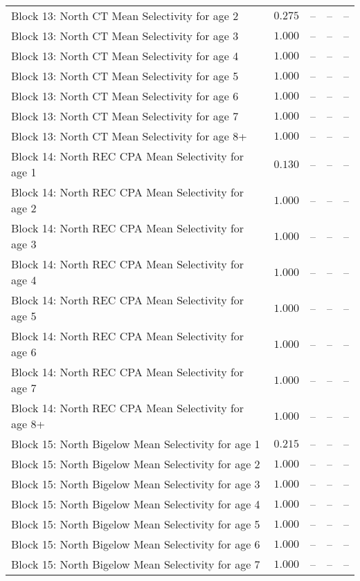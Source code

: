\documentclass[
]{article}
\begin{document}
\begin{landscape}
\begin{longtable}[t]{lrrrr}
Block 13: North CT Mean Selectivity for age 2 & $0.275$ & -- & -- & --\\
\addlinespace
Block 13: North CT Mean Selectivity for age 3 & $1.000$ & -- & -- & --\\
Block 13: North CT Mean Selectivity for age 4 & $1.000$ & -- & -- & --\\
Block 13: North CT Mean Selectivity for age 5 & $1.000$ & -- & -- & --\\
Block 13: North CT Mean Selectivity for age 6 & $1.000$ & -- & -- & --\\
Block 13: North CT Mean Selectivity for age 7 & $1.000$ & -- & -- & --\\
\addlinespace
Block 13: North CT Mean Selectivity for age 8+ & $1.000$ & -- & -- & --\\
Block 14: North REC CPA Mean Selectivity for age 1 & $0.130$ & -- & -- & --\\
Block 14: North REC CPA Mean Selectivity for age 2 & $1.000$ & -- & -- & --\\
Block 14: North REC CPA Mean Selectivity for age 3 & $1.000$ & -- & -- & --\\
Block 14: North REC CPA Mean Selectivity for age 4 & $1.000$ & -- & -- & --\\
\addlinespace
Block 14: North REC CPA Mean Selectivity for age 5 & $1.000$ & -- & -- & --\\
Block 14: North REC CPA Mean Selectivity for age 6 & $1.000$ & -- & -- & --\\
Block 14: North REC CPA Mean Selectivity for age 7 & $1.000$ & -- & -- & --\\
Block 14: North REC CPA Mean Selectivity for age 8+ & $1.000$ & -- & -- & --\\
Block 15: North Bigelow Mean Selectivity for age 1 & $0.215$ & -- & -- & --\\
\addlinespace
Block 15: North Bigelow Mean Selectivity for age 2 & $1.000$ & -- & -- & --\\
Block 15: North Bigelow Mean Selectivity for age 3 & $1.000$ & -- & -- & --\\
Block 15: North Bigelow Mean Selectivity for age 4 & $1.000$ & -- & -- & --\\
Block 15: North Bigelow Mean Selectivity for age 5 & $1.000$ & -- & -- & --\\
Block 15: North Bigelow Mean Selectivity for age 6 & $1.000$ & -- & -- & --\\
\addlinespace
Block 15: North Bigelow Mean Selectivity for age 7 & $1.000$ & -- & -- & --\\

\end{longtable}
\end{landscape}
\end{document}
